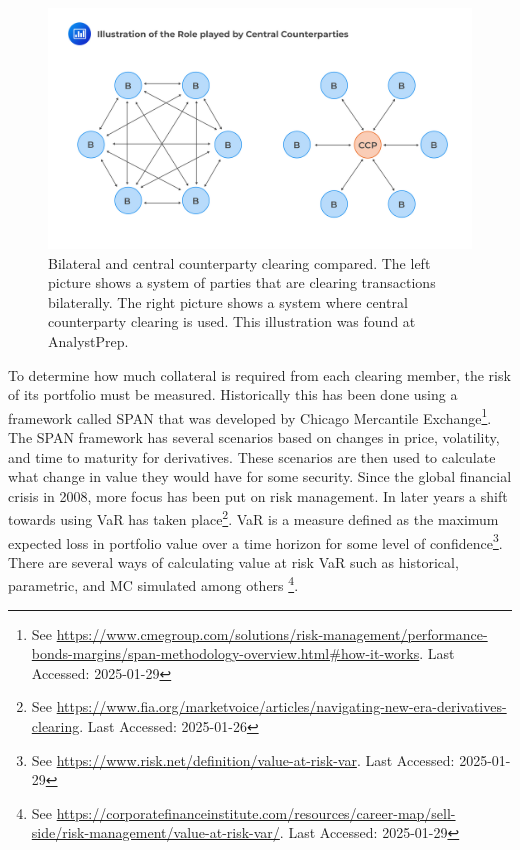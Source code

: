 \begin{figure}[ht]
    \centering
    \includegraphics[width=0.7\linewidth]{1Introduction/pictures/CCPvisual .jpg}
    \caption{Bilateral and central counterparty clearing compared. The left picture shows a system of parties that are clearing transactions bilaterally. The right picture shows a system where central counterparty clearing is used. This illustration was found at AnalystPrep\protect\footnotemark[\value{footnote}]. }
    \label{fig:CCP}
\end{figure}

To determine how much collateral is required from each clearing member, the risk of its portfolio must be measured. Historically this has been done using a framework called \gls{SPAN} that was developed by Chicago Mercantile Exchange\footnote{See \url{https://www.cmegroup.com/solutions/risk-management/performance-bonds-margins/span-methodology-overview.html\#how-it-works}.  Last Accessed: 2025-01-29}. The \gls{SPAN} framework has several scenarios based on changes in price, volatility, and time to maturity for derivatives. These scenarios are then used to calculate what change in value they would have for some security. Since the global financial crisis in 2008, more focus has been put on risk management. In later years a shift towards using \gls{VaR} has taken place\footnote{See \url{https://www.fia.org/marketvoice/articles/navigating-new-era-derivatives-clearing}. Last Accessed: 2025-01-26}. \gls{VaR} is a measure defined as the maximum expected loss in portfolio value over a time horizon for some level of confidence\footnote{See \url{https://www.risk.net/definition/value-at-risk-var}. Last Accessed: 2025-01-29}. There are several ways of calculating value at risk \gls{VaR} such as historical, parametric, and \gls{MC} simulated among others \footnote{See \url{https://corporatefinanceinstitute.com/resources/career-map/sell-side/risk-management/value-at-risk-var/}. Last Accessed: 2025-01-29}.  


